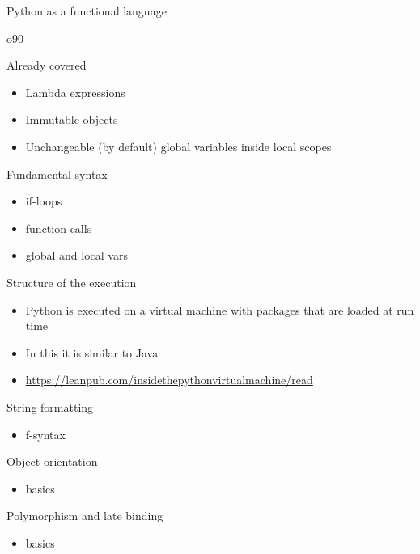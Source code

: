 \documentclass{beamer}
\begin{document}
\begin{frame}
{\centerline{Python as a functional language}}
\end{frame}

o90\begin{frame}
{\centerline{Already covered}}
\begin{itemize}
    \item Lambda expressions
    \item Immutable objects
    \item Unchangeable (by default) global variables inside local scopes
\end{itemize} 
\end{frame}



\begin{frame}
{\centerline{Fundamental syntax}}
\begin{itemize}
    \item if-loops
    \item function calls
    \item global and local vars
\end{itemize} 
\end{frame}


\begin{frame}
{\centerline{Structure of the execution}}
\begin{itemize}
    \item Python is executed on a virtual machine with packages that are loaded at run time
    \item In this it is similar to Java
    \item \url{https://leanpub.com/insidethepythonvirtualmachine/read}
\end{itemize} 
\end{frame}

\begin{frame}
{\centerline{String formatting}}
\begin{itemize}
    \item f-syntax
\end{itemize} 
\end{frame}

\begin{frame}
{\centerline{Object orientation}}
\begin{itemize}
    \item basics
\end{itemize} 
\end{frame}


\begin{frame}
{\centerline{Polymorphism and late binding}}
\begin{itemize}
    \item basics
\end{itemize} 
\end{frame}
\end{document}
